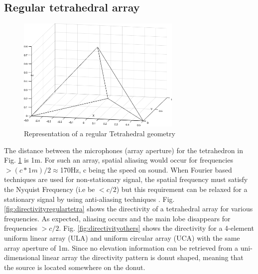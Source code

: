 \subsection{Regular tetrahedral array}



\begin{figure}[H]
    \centering
    \includegraphics[width=0.7\textwidth]{Figures/regulartetra.png}
    \caption{Representation of a regular Tetrahedral geometry}
    \label{fig:regulartetra}
\end{figure}

The distance between the microphones (array aperture) for the tetrahedron in Fig. \ref{fig:regulartetra} is 1m. For such an array, spatial aliasing would occur for frequencies $> (c*1m)/2 \approx $170Hz, c being the speed on sound.  When Fourier based techniques are used for non-stationary signal, the spatial frequency must satisfy the Nyquist Frequency (i.e be $< c/2$) but this requirement can be relaxed for a stationary signal by using anti-aliasing techniques \cite{dmochowski2009spatial}. Fig. \ref{fig:directivityregulartetra} shows the directivity of a tetrahedral array for various frequencies. As expected, aliasing occurs and the main lobe disappears for frequencies $> c/2$. Fig. \ref{fig:directivityothers} shows the directivity for a 4-element uniform linear array (ULA) and uniform circular array (UCA) with the same array aperture of 1m. Since no elevation information can be retrieved from a uni-dimensional linear array the directivity pattern is donut shaped, meaning that the source is located somewhere on the donut. 


